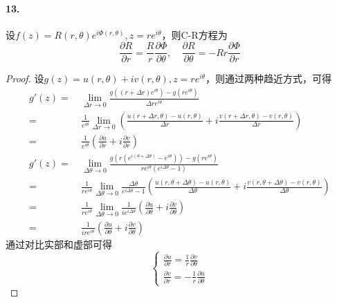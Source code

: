 \documentclass[12pt, a4paper, oneside]{ctexart}
\begin{document}
\paragraph{13.}设$f(z)=R(r,\theta)e^{i\Phi(r,\theta)},z=re^{i\theta}$，则C-R方程为
\begin{equation*}
    \frac{\partial R}{\partial r}=\frac{R}{r}\frac{\partial\Phi}{\partial \theta},\quad \frac{\partial R}{\partial \theta}=-Rr\frac{\partial \Phi}{\partial r}
\end{equation*}
\begin{proof}
    设$g(z)=u(r,\theta)+iv(r,\theta), z=re^{i\theta}$，则通过两种趋近方式，可得
    \begin{equation*}
        \begin{aligned}
            g'(z) =&\ \lim_{\Delta r\rightarrow 0}\frac{g((r+\Delta r)e^{i\theta})-g(re^{i\theta})}{\Delta re^{i\theta}}\\
            =&\ \frac{1}{e^{i\theta}}\lim_{\Delta r\rightarrow 0}\left(\frac{u(r+\Delta r,\theta)-u(r,\theta)}{\Delta r}+i\frac{v(r+\Delta r,\theta)-v(r,\theta)}{\Delta r}\right)\\
            =&\ \frac{1}{e^{i\theta}}\left(\frac{\partial u}{\partial r}+i\frac{\partial v}{\partial r}\right)\\
            g'(z)=&\ \lim_{\Delta\theta\rightarrow 0}\frac{g(r(e^{i(\theta+\Delta\theta)}-e^{i\theta}))-g(re^{i\theta})}{re^{i\theta}(e^{i\Delta\theta}-1)}\\
            =&\ \frac{1}{re^{i\theta}}\lim_{\Delta\theta\rightarrow 0}\frac{\Delta\theta}{e^{i\Delta\theta}-1}\left(\frac{u(r,\theta+\Delta\theta)-u(r,\theta)}{\Delta \theta}+i\frac{v(r,\theta+\Delta\theta)-v(r,\theta)}{\Delta \theta}\right)\\
            =&\ \frac{1}{re^{i\theta}}\lim_{\Delta\theta\rightarrow 0}\frac{1}{ie^{i\Delta\theta}}\left(\frac{\partial u}{\partial \theta}+i\frac{\partial v}{\partial \theta}\right)\\
            =&\ \frac{1}{ire^{i\theta}}\left(\frac{\partial u}{\partial \theta}+i\frac{\partial v}{\partial \theta}\right)
        \end{aligned}
    \end{equation*}
    通过对比实部和虚部可得
    \begin{equation*}
        \begin{cases}
            \displaystyle\frac{\partial u}{\partial r}=\frac{1}{r}\frac{\partial v}{\partial \theta}\\
            \displaystyle\frac{\partial v}{\partial r}=-\frac{1}{r}\frac{\partial u}{\partial \theta}

\end{cases}
\end{equation*}
\end{proof}
\end{document}
